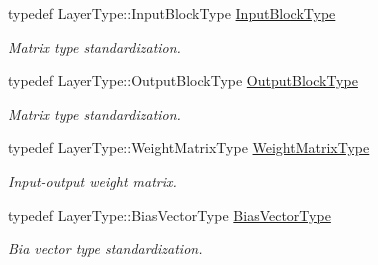 \begin{DoxyCompactItemize}
typedef Layer\-Type\-::\-Input\-Block\-Type \hyperlink{classffnn_1_1optimizer_1_1_adam_3_01layer_1_1_fully_connected_3_01_value_type_00_01_inputs_at_co08ce471fd3ee7441a350cc42cfd35bcd_a0f9a1a492d0763a6068fd01c3c8d705a}{Input\-Block\-Type}
\begin{DoxyCompactList}\small\item\em Matrix type standardization. \end{DoxyCompactList}\item 
typedef Layer\-Type\-::\-Output\-Block\-Type \hyperlink{classffnn_1_1optimizer_1_1_adam_3_01layer_1_1_fully_connected_3_01_value_type_00_01_inputs_at_co08ce471fd3ee7441a350cc42cfd35bcd_a6b5ddc1adcb4bbc052bda25ac5ecef0b}{Output\-Block\-Type}
\begin{DoxyCompactList}\small\item\em Matrix type standardization. \end{DoxyCompactList}\item 
typedef Layer\-Type\-::\-Weight\-Matrix\-Type \hyperlink{classffnn_1_1optimizer_1_1_adam_3_01layer_1_1_fully_connected_3_01_value_type_00_01_inputs_at_co08ce471fd3ee7441a350cc42cfd35bcd_aac2f4d3e444074ab554d2a0a45ba1daf}{Weight\-Matrix\-Type}
\begin{DoxyCompactList}\small\item\em Input-\/output weight matrix. \end{DoxyCompactList}\item 
typedef Layer\-Type\-::\-Bias\-Vector\-Type \hyperlink{classffnn_1_1optimizer_1_1_adam_3_01layer_1_1_fully_connected_3_01_value_type_00_01_inputs_at_co08ce471fd3ee7441a350cc42cfd35bcd_ac7a23bb92a19d1155a19feefbb5d366d}{Bias\-Vector\-Type}
\begin{DoxyCompactList}\small\item\em Bia vector type standardization. \end{DoxyCompactList}\end{DoxyCompactItemize}
